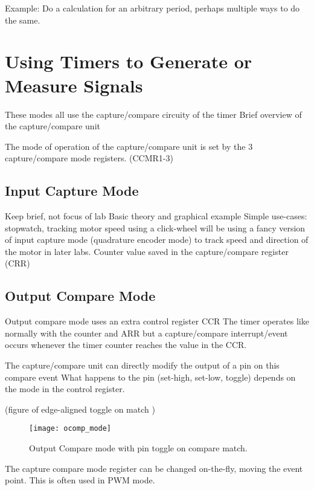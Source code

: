 \documentclass[11pt,fleqn]{book} %
\begin{document}
        \begin{example} 
                Example: Do a calculation for an arbitrary period, perhaps multiple ways to do the same. 
        \end{example}
    

\section{Using Timers to Generate or Measure Signals}
    These modes all use the capture/compare circuity of the timer
    Brief overview of the capture/compare unit
    
    The mode of operation of the capture/compare unit is set by the 3 capture/compare mode registers. (CCMR1-3)				
    
    \subsection{Input Capture Mode}
        Keep brief, not focus of lab
        Basic theory and graphical example		
        Simple use-cases: stopwatch, tracking motor speed using a click-wheel
            will be using a fancy version of input capture mode (quadrature encoder mode) to track speed and direction of the motor in later labs.
        Counter value saved in the capture/compare register (CRR)
    
    \subsection{Output Compare Mode}
        Output compare mode uses an extra control register CCR
        The timer operates like normally with the counter and ARR but a capture/compare interrupt/event occurs whenever the timer counter reaches the value in the CCR.
        
        The capture/compare unit can directly modify the output of a pin on this compare event
        What happens to the pin (set-high, set-low, toggle) depends on the mode in the control register. 
        
        (figure of edge-aligned toggle on match )
        \begin{figure}[]
            \centering\texttt{[image: ocomp\_mode]}
            \caption{Output Compare mode with pin toggle on compare match.}
            \label{ocomp_mode}
        \end{figure}
    
        The capture compare mode register can be changed on-the-fly, moving the event point. This is often used in PWM mode.
    
\end{document}
